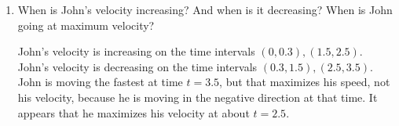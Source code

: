 \documentclass[nooutcomes]{ximera}
\begin{document}
\begin{problem}
\begin{enumerate}
		
		
	\item  When is John's velocity increasing?  And when is it decreasing?  When is John going at maximum velocity?
		\begin{freeResponse}
		John's velocity is increasing on the time intervals $(0,0.3),(1.5,2.5)$.  John's velocity is decreasing on the time intervals $(0.3, 1.5),(2.5,3.5)$.  John is moving the fastest at time $t = 3.5$, but that maximizes his speed, not his velocity, because he is moving in the negative direction at that time.  It appears that he maximizes his velocity at about $t=2.5$.  
		\end{freeResponse}
		
		
		
	\end{enumerate}
			
			
	
\end{problem}
\end{document}
